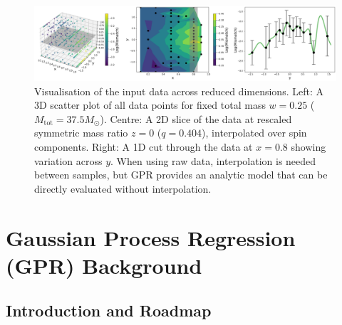\documentclass{ucdgradtaughtthesis}
\begin{document}
    \begin{figure}[H]
        \centering
        \includegraphics[width=\textwidth]{LatexPlots/final_gps_plots/data_visual.png}
        \caption[Visualisation of the input data across reduced dimensions.]{
        Visualisation of the input data across reduced dimensions. 
        Left: A 3D scatter plot of all data points for fixed total mass \(w = 0.25\) ($M_\text{tot}=37.5 M_\odot$). 
        Centre: A 2D slice of the data at rescaled symmetric mass ratio \(z = 0\) ($q=0.404$), interpolated over spin components.
        Right: A 1D cut through the data at \(x = 0.8\) showing variation across \(y\). 
        When using raw data, interpolation is needed between samples, but GPR provides an analytic model that can be directly evaluated without interpolation.
        }
        \label{fig:visualising_data}
    \end{figure}







\chapter{Gaussian Process Regression (GPR) Background}
\section{Introduction and Roadmap}
\end{document}
